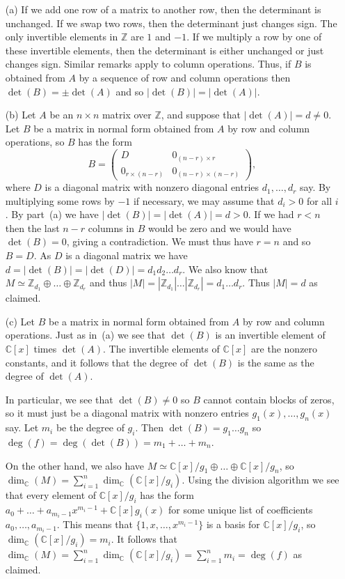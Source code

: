 \documentclass{amsart}
\newcommand{\C}         {{\mathbb{C}}}
\newcommand{\Z}         {{\mathbb{Z}}}
\newcommand{\tm}        {\times}
\newcommand{\op}        {\oplus}
\newcommand{\blockmat}[4]{
 \left(\begin{array}{c|c} #1&#2 \\ \hline #3&#4\end{array}\right)}
\renewcommand{\:}{\colon}
\theoremstyle{definition}
\renewenvironment{solution}{\SolutionAtEnd}{\endSolutionAtEnd}
\begin{document}
\begin{solution}
 \begin{itemize}
  \item[(a)] If we add one row of a matrix to another row, then the
   determinant is unchanged.  If we swap two rows, then the
   determinant just changes sign.  The only invertible elements in
   $\Z$ are $1$ and $-1$.  If we multiply a row by one of these
   invertible elements, then the determinant is either unchanged or
   just changes sign.  Similar remarks apply to column operations.
   Thus, if $B$ is obtained from $A$ by a sequence of row and column
   operations then $\det(B)=\pm\det(A)$ and so $|\det(B)|=|\det(A)|$.
  \item[(b)] Let $A$ be an $n\tm n$ matrix over $\Z$, and suppose
   that $|\det(A)|=d\neq 0$.  Let $B$ be a matrix in normal form
   obtained from $A$ by row and column operations, so $B$ has the form 
   \[ B = \blockmat{D}{0_{(n-r)\tm r}}{0_{r\tm(n-r)}}{0_{(n-r)\tm(n-r)}},
   \]
   where $D$ is a diagonal matrix with nonzero diagonal entries
   $d_1,\ldots,d_r$ say.  By multiplying some rows by $-1$ if
   necessary, we may assume that $d_i>0$ for all $i$.  By part~(a) we
   have $|\det(B)|=|\det(A)|=d>0$.  If we had $r<n$ then the last
   $n-r$ columns in $B$ would be zero and we would have $\det(B)=0$,
   giving a contradiction.  We must thus have $r=n$ and so $B=D$.  As
   $D$ is a diagonal matrix we have
   $d=|\det(B)|=|\det(D)|=d_1d_2\ldots d_r$.  We also know that
   $M\simeq \Z_{d_1}\op\ldots\op\Z_{d_r}$ and thus
   $|M|=|\Z_{d_1}|\ldots|\Z_{d_r}|=d_1\ldots d_r$.  Thus $|M|=d$ as
   claimed. 
  \item[(c)] Let $B$ be a matrix in normal form obtained from $A$ by
   row and column operations.  Just as in~(a) we see that $\det(B)$ is
   an invertible element of $\C[x]$ times $\det(A)$.  The invertible
   elements of $\C[x]$ are the nonzero constants, and it follows that
   the degree of $\det(B)$ is the same as the degree of $\det(A)$.  

   In particular, we see that $\det(B)\neq 0$ so $B$ cannot contain
   blocks of zeros, so it must just be a diagonal matrix with nonzero
   entries $g_1(x),\ldots,g_n(x)$ say.  Let $m_i$ be the degree of
   $g_i$.  Then $\det(B)=g_1\ldots g_n$ so
   $\deg(f)=\deg(\det(B))=m_1+\ldots+m_n$.

   On the other hand, we also have
   $M\simeq\C[x]/g_1\op\ldots\op\C[x]/g_n$, so
   $\dim_\C(M)=\sum_{i=1}^n\dim_\C(\C[x]/g_i)$.  Using the division
   algorithm we see that every element of $\C[x]/g_i$ has the form
   $a_0+\ldots+a_{m_i-1}x^{m_i-1}+\C[x]g_i(x)$ for some unique list of
   coefficients $a_0,\ldots,a_{m_i-1}$.  This means that
   $\{1,x,\ldots,x^{m_i-1}\}$ is a basis for $\C[x]/g_i$, so
   $\dim_\C(\C[x]/g_i)=m_i$.  It follows that
   $\dim_\C(M)=\sum_{i=1}^n\dim_\C(\C[x]/g_i)=\sum_{i=1}^nm_i=\deg(f)$
   as claimed.
 \end{itemize}
\end{solution}
\end{document}
